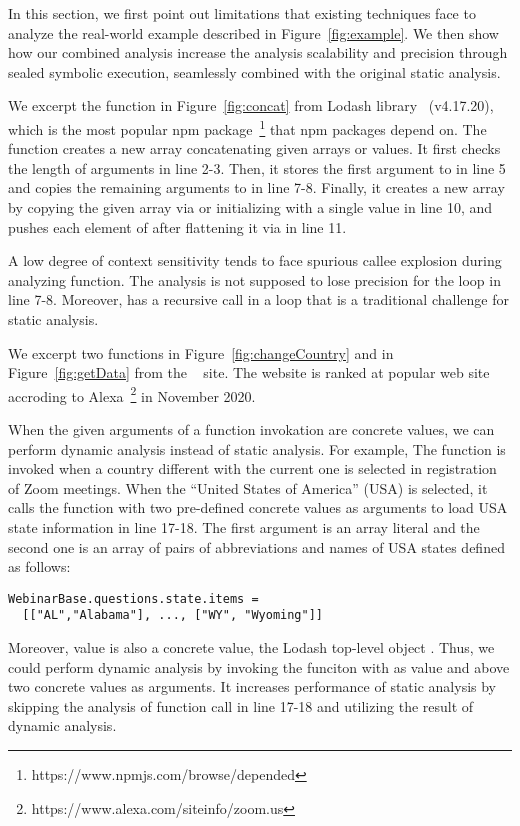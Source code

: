 In this section, we first point out limitations that existing techniques face to
analyze the real-world example described in Figure~\ref{fig:example}.
We then show how our combined analysis increase the analysis scalability and
precision through sealed symbolic execution, seamlessly combined with the original
static analysis.


We excerpt the  function in Figure~\ref{fig:concat} from Lodash
library~\cite{lodash} (v4.17.20), which is the most popular npm package~\footnote{https://www.npmjs.com/browse/depended}
that  npm packages depend on.
The  function creates a new array concatenating given arrays or
values.
It first checks the length of arguments in line 2-3. Then, it stores the first
argument to  in line 5 and copies the remaining arguments to
 in line 7-8.
Finally, it creates a new array by copying the given array via 
or initializing with a single value in line 10, and pushes each element of
 after flattening it via  in line 11.


A low degree of context sensitivity tends to face spurious callee explosion
during analyzing  function.
The analysis is not supposed to lose precision for the loop in line 7-8.
Moreover,  has a recursive call in a loop that is a
traditional challenge for static analysis.


We excerpt two functions  in Figure~\ref{fig:changeCountry}
and  in Figure~\ref{fig:getData} from the ~\cite{zoom}
site.
The website  is ranked at  popular web site accroding
to Alexa~\footnote{https://www.alexa.com/siteinfo/zoom.us} in November 2020.


When the given arguments of a function invokation are concrete values, we can
perform dynamic analysis instead of static analysis. For example, The
 function is invoked when a country different with the
current one is selected in registration of Zoom meetings.  When the ``United
States of America'' (USA) is selected, it calls the  function
with two pre-defined concrete values as arguments to load USA state information
in line 17-18.  The first argument is an array literal  and the second one is an array of pairs of abbreviations and names of
USA states defined as follows:
\begin{lstlisting}[style=myJSstyle,numbers=none]
WebinarBase.questions.state.items =
  [["AL","Alabama"], ..., ["WY", "Wyoming"]]
\end{lstlisting}
Moreover,  value is also a concrete value, the Lodash top-level
object \jscode{\_}.  Thus, we could perform dynamic analysis by invoking the
 funciton with \jscode{\_} as  value and above two
concrete values as arguments.  It increases performance of static analysis by
skipping the analysis of function call in line 17-18 and utilizing the result of
dynamic analysis.

